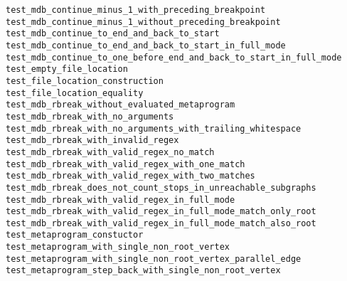 \begin{description}
    \item[\texttt{test\_mdb\_continue\_minus\_1\_with\_preceding\_breakpoint}]
    \item[\texttt{test\_mdb\_continue\_minus\_1\_without\_preceding\_breakpoint}]
    \item[\texttt{test\_mdb\_continue\_to\_end\_and\_back\_to\_start}]
    \item[\texttt{test\_mdb\_continue\_to\_end\_and\_back\_to\_start\_in\_full\_mode}]
    \item[\texttt{test\_mdb\_continue\_to\_one\_before\_end\_and\_back\_to\_start\_in\_full\_mode}]
    \item[\texttt{test\_empty\_file\_location}]
    \item[\texttt{test\_file\_location\_construction}]
    \item[\texttt{test\_file\_location\_equality}]
    \item[\texttt{test\_mdb\_rbreak\_without\_evaluated\_metaprogram}]
    \item[\texttt{test\_mdb\_rbreak\_with\_no\_arguments}]
    \item[\texttt{test\_mdb\_rbreak\_with\_no\_arguments\_with\_trailing\_whitespace}]
    \item[\texttt{test\_mdb\_rbreak\_with\_invalid\_regex}]
    \item[\texttt{test\_mdb\_rbreak\_with\_valid\_regex\_no\_match}]
    \item[\texttt{test\_mdb\_rbreak\_with\_valid\_regex\_with\_one\_match}]
    \item[\texttt{test\_mdb\_rbreak\_with\_valid\_regex\_with\_two\_matches}]
    \item[\texttt{test\_mdb\_rbreak\_does\_not\_count\_stops\_in\_unreachable\_subgraphs}]
    \item[\texttt{test\_mdb\_rbreak\_with\_valid\_regex\_in\_full\_mode}]
    \item[\texttt{test\_mdb\_rbreak\_with\_valid\_regex\_in\_full\_mode\_match\_only\_root}]
    \item[\texttt{test\_mdb\_rbreak\_with\_valid\_regex\_in\_full\_mode\_match\_also\_root}]
    \item[\texttt{test\_metaprogram\_constuctor}]
    \item[\texttt{test\_metaprogram\_with\_single\_non\_root\_vertex}]
    \item[\texttt{test\_metaprogram\_with\_single\_non\_root\_vertex\_parallel\_edge}]
    \item[\texttt{test\_metaprogram\_step\_back\_with\_single\_non\_root\_vertex}]

\end{description}
